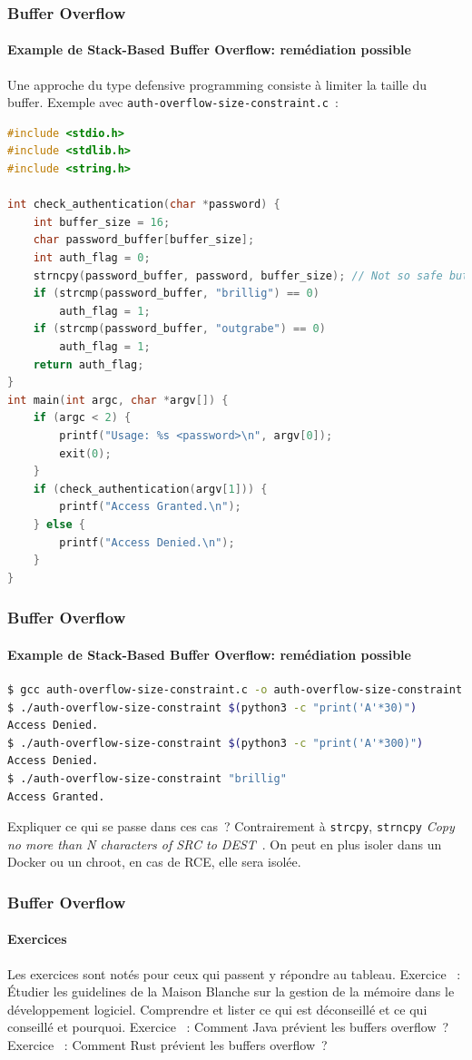 \documentclass{beamer}
\begin{document}
    \begin{frame}[fragile]
        \frametitle{Buffer Overflow}
        \framesubtitle{Example de Stack-Based Buffer Overflow: remédiation possible}
        \transdissolve
        Une approche du type defensive programming consiste à limiter la taille du buffer.
        Exemple avec \lstinline{auth-overflow-size-constraint.c}~:
        \begin{lstlisting}[language=C,basicstyle=\tiny\ttfamily]
#include <stdio.h>
#include <stdlib.h>
#include <string.h>

int check_authentication(char *password) {
    int buffer_size = 16;
    char password_buffer[buffer_size];
    int auth_flag = 0;
    strncpy(password_buffer, password, buffer_size); // Not so safe but better
    if (strcmp(password_buffer, "brillig") == 0)
        auth_flag = 1;
    if (strcmp(password_buffer, "outgrabe") == 0)
        auth_flag = 1;
    return auth_flag;
}
int main(int argc, char *argv[]) {
    if (argc < 2) {
        printf("Usage: %s <password>\n", argv[0]);
        exit(0);
    }
    if (check_authentication(argv[1])) {
        printf("Access Granted.\n");
    } else {
        printf("Access Denied.\n");
    }
}
        \end{lstlisting}
    \end{frame}

    \begin{frame}[fragile]
        \frametitle{Buffer Overflow}
        \framesubtitle{Example de Stack-Based Buffer Overflow: remédiation possible}
        \transdissolve
        \begin{lstlisting}[language=bash]
$ gcc auth-overflow-size-constraint.c -o auth-overflow-size-constraint
$ ./auth-overflow-size-constraint $(python3 -c "print('A'*30)")
Access Denied.
$ ./auth-overflow-size-constraint $(python3 -c "print('A'*300)")
Access Denied.
$ ./auth-overflow-size-constraint "brillig"
Access Granted.
        \end{lstlisting}
        Expliquer ce qui se passe dans ces cas~?
        \pause
        \bigbreak
        Contrairement à \lstinline{strcpy}, \lstinline{strncpy} \textit{Copy no more than N characters of SRC to DEST}~.
        \bigbreak
        On peut en plus isoler dans un Docker ou un chroot, en cas de RCE, elle sera isolée.
    \end{frame}

    \begin{frame}
        \frametitle{Buffer Overflow}
        \framesubtitle{Exercices}
        \transdissolve
        Les exercices sont notés pour ceux qui passent y répondre au tableau.
        \bigbreak
        Exercice \execcounterdispinc{}~:
        Étudier les guidelines de la Maison Blanche sur la gestion de la mémoire dans le développement logiciel.
        \bigbreak
        Comprendre et lister ce qui est déconseillé et ce qui conseillé et pourquoi.
        \transdissolve
        Exercice \execcounterdispinc{}~:
        Comment Java prévient les buffers overflow~?
        \bigbreak
        Exercice \execcounterdispinc{}~:
        Comment Rust prévient les buffers overflow~?
    \end{frame}
\end{document}
